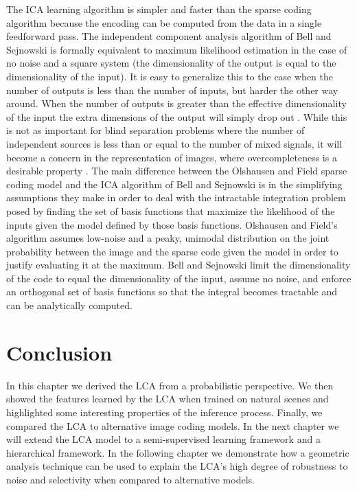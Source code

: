 The ICA learning algorithm is simpler and faster than the sparse coding algorithm because the encoding can be computed from the data in a single feedforward pass. The independent component analysis algorithm of Bell and Sejnowski \citeyearpar{bell1997independent} is formally equivalent to maximum likelihood estimation in the case of no noise and a square system (the dimensionality of the output is equal to the dimensionality of the input). It is easy to generalize this to the case when the number of outputs is less than the number of inputs, but harder the other way around. When the number of outputs is greater than the effective dimensionality of the input the extra dimensions of the output will simply drop out \parencite{livezey2016degeneracy, le2011ica}. While this is not as important for blind separation problems where the number of independent sources is less than or equal to the number of mixed signals, it will become a concern in the representation of images, where overcompleteness is a desirable property \parencite{simoncelli1991shiftable}. The main difference between the Olshausen and Field \citeyearpar{olshausen1996emergence} sparse coding model and the ICA algorithm of Bell and Sejnowski \citeyearpar{bell1997independent} is in the simplifying assumptions they make in order to deal with the intractable integration problem posed by finding the set of basis functions that maximize the likelihood of the inputs given the model defined by those basis functions. Olshausen and Field’s algorithm assumes low-noise and a peaky, unimodal distribution on the joint probability between the image and the sparse code given the model in order to justify evaluating it at the maximum. Bell and Sejnowski limit the dimensionality of the code to equal the dimensionality of the input, assume no noise, and enforce an orthogonal set of basis functions so that the integral becomes tractable and can be analytically computed.


\section{Conclusion}
In this chapter we derived the LCA from a probabilistic perspective. We then showed the features learned by the LCA when trained on natural scenes and highlighted some interesting properties of the inference process. Finally, we compared the LCA to alternative image coding models. In the next chapter we will extend the LCA model to a semi-supervised learning framework and a hierarchical framework. In the following chapter we demonstrate how a geometric analysis technique can be used to explain the LCA's high degree of robustness to noise and selectivity when compared to alternative models.

